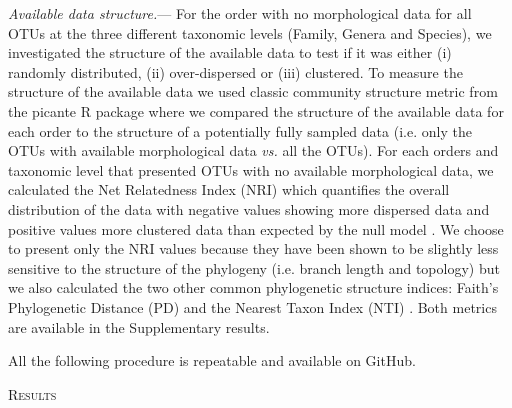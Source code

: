 \documentclass[12pt,letterpaper]{article}
\renewcommand{\section}[1]{%
\bigskip
\begin{center}
\begin{Large}
\normalfont\scshape #1
\medskip
\end{Large}
\end{center}}
\renewcommand{\subsubsection}[1]{%
\vspace{2ex}
\noindent
\textit{#1.}---}
\begin{document}
\subsubsection{Available data structure}
For the order with no morphological data for all OTUs at the three different taxonomic levels (Family, Genera and Species), we investigated the structure of the available data to test if it was either (i) randomly distributed, (ii) over-dispersed or (iii) clustered. To measure the structure of the available data we used classic community structure metric from the picante R package \cite{picante} where we compared the structure of the available data for each order to the structure of a potentially fully sampled data (i.e. only the OTUs with available morphological data \textit{vs.} all the OTUs).
For each orders and taxonomic level that presented OTUs with no available morphological data, we calculated the Net Relatedness Index (NRI) which quantifies the overall distribution of the data with negative values showing more dispersed data and positive values more clustered data than expected by the null model \cite{webb2002phylogenies}. We choose to present only the NRI values because they have been shown to be slightly less sensitive to the structure of the phylogeny (i.e. branch length and topology) \cite{NRI,journal.pone.0004390} but we also calculated the two other common phylogenetic structure indices: Faith's Phylogenetic Distance (PD)\cite{Faith19921} and the Nearest Taxon Index (NTI) \cite{webb2002phylogenies}. Both metrics are available in the Supplementary results.


All the following procedure is repeatable and available on GitHub. %

%
%

\section{Results}
\end{document}
